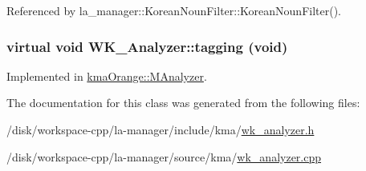 Referenced by la\_\-manager::KoreanNounFilter::KoreanNounFilter().\hypertarget{classWK__Analyzer_4f71176a5b7359b73631bad1c506be21}{
\subsubsection[{tagging}]{\setlength{\rightskip}{0pt plus 5cm}virtual void WK\_\-Analyzer::tagging (void)}}
\label{classWK__Analyzer_4f71176a5b7359b73631bad1c506be21}




Implemented in \hyperlink{classkmaOrange_1_1MAnalyzer_bfaa2e57bc40b4a60264aee49c467f53}{kmaOrange::MAnalyzer}.

The documentation for this class was generated from the following files:\begin{CompactItemize}
\item 
/disk/workspace-cpp/la-manager/include/kma/\hyperlink{wk__analyzer_8h}{wk\_\-analyzer.h}\item 
/disk/workspace-cpp/la-manager/source/kma/\hyperlink{wk__analyzer_8cpp}{wk\_\-analyzer.cpp}\end{CompactItemize}
